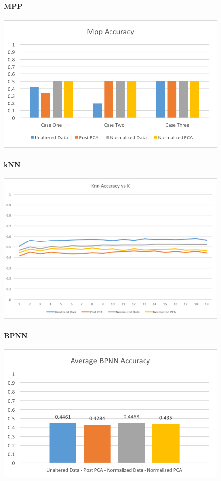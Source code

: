 \documentclass{article}
\begin{document}
\paragraph{MPP}
\centerline{\includegraphics[width = 4.5in]{images/mpp-results}}

\paragraph{kNN}
\centerline{\includegraphics[width = 4.5in]{images/knn-results}}

\paragraph{BPNN}
\centerline{\includegraphics[width = 4.5in]{images/bpnn-results}}
\end{document}
